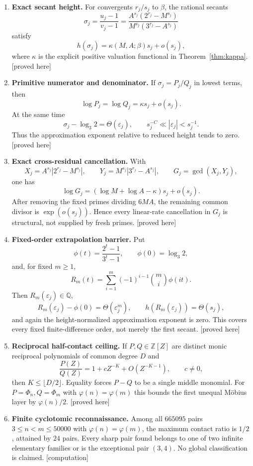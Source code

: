 \documentclass[11pt,oneside]{article}
\theoremstyle{definition}
\theoremstyle{remark}
\newcommand{\Z}{\mathbb Z}
\newcommand{\Q}{\mathbb Q}
\newcommand{\eps}{\varepsilon}
\newcommand{\proved}{\textcolor{deepgreen}{\textsf{[proved here]}}}
\newcommand{\computed}{\textcolor{deepviolet}{\textsf{[computation]}}}
\begin{document}
\begin{enumerate}
\item \textbf{Exact secant height.}  For convergents $r_j/s_j$ to $\beta$, the rational
secants
\[
 \sigma_j=\frac{u_j-1}{v_j-1}
 =\frac{A^{s_j}(2^{r_j}-M^{s_j})}
        {M^{s_j}(3^{r_j}-A^{s_j})}
\]
satisfy
\[
 h(\sigma_j)=\kappa(M,A;\beta)s_j+o(s_j),
\]
where $\kappa$ is the explicit positive valuation functional in
Theorem~\ref{thm:kappa}.  \proved

\item \textbf{Primitive numerator and denominator.}  If $\sigma_j=P_j/Q_j$ in lowest
terms, then
\[
 \log P_j=\log Q_j=\kappa s_j+o(s_j).
\]
At the same time
\[
 \sigma_j-\log_3 2=\Theta(\eps_j),
 \qquad s_j^{-C}\ll|\eps_j|<s_j^{-1}.
\]
Thus the approximation exponent relative to reduced height tends to zero.  \proved

\item \textbf{Exact cross-residual cancellation.}  With
\[
 X_j=A^{s_j}|2^{r_j}-M^{s_j}|,
 \qquad
 Y_j=M^{s_j}|3^{r_j}-A^{s_j}|,
 \qquad
 G_j=\gcd(X_j,Y_j),
\]
one has
\[
 \log G_j=(\log M+\log A-\kappa)s_j+o(s_j).
\]
After removing the fixed primes dividing $6MA$, the remaining common divisor is
$\exp(o(s_j))$.  Hence every linear-rate cancellation in $G_j$ is structural, not supplied
by fresh primes.  \proved

\item \textbf{Fixed-order extrapolation barrier.}  Put
\[
 \phi(t)=\frac{2^t-1}{3^t-1},\qquad \phi(0)=\log_3 2,
\]
and, for fixed $m\ge1$,
\[
 R_m(t)=\sum_{i=1}^m(-1)^{i-1}\binom mi\phi(it).
\]
Then $R_m(\eps_j)\in\Q$,
\[
 R_m(\eps_j)-\phi(0)=\Theta(\eps_j^m),
 \qquad h(R_m(\eps_j))=\Theta(s_j),
\]
and again the height-normalized approximation exponent is zero.  This covers every fixed
finite-difference order, not merely the first secant.  \proved

\item \textbf{Reciprocal half-contact ceiling.}  If $P,Q\in\Z[Z]$ are distinct monic
reciprocal polynomials of common degree $D$ and
\[
 \frac{P(Z)}{Q(Z)}=1+cZ^{-K}+O(Z^{-K-1}),\qquad c\ne0,
\]
then $K\le\lfloor D/2\rfloor$.  Equality forces $P-Q$ to be a single middle monomial.
For $P=\Phi_n,Q=\Phi_m$ with $\varphi(n)=\varphi(m)$ this bounds the first unequal
M\"obius layer by $\varphi(n)/2$.  \proved

\item \textbf{Finite cyclotomic reconnaissance.}  Among all $665095$ pairs
$3\le n<m\le50000$ with $\varphi(n)=\varphi(m)$, the maximum contact ratio is $1/2$,
attained by $24$ pairs.  Every sharp pair found belongs to one of two infinite elementary
families or is the exceptional pair $(3,4)$.  No global classification is claimed.
\computed
\end{enumerate}
\end{document}
